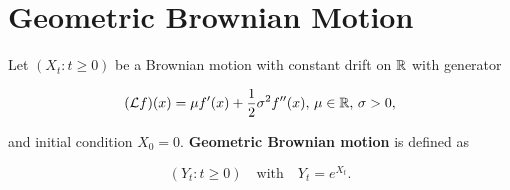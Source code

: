 \newpage
\section{Geometric Brownian Motion}

Let $(X_t: t \ge 0)$ be a Brownian motion with constant drift on $\mathbb{R}$ with generator

\begin{equation*}
    (\mathcal{L}f)(x) = \mu f'(x) + \frac{1}{2} \sigma^2 f''(x), \, \mu \in \mathbb{R},\, \sigma > 0,
\end{equation*}

and initial condition $X_0 = 0$. \textbf{Geometric Brownian motion} is defined as

\begin{equation*}
    (Y_t: t \ge 0) \quad \text{with} \quad Y_t = e^{X_t}.
\end{equation*}


